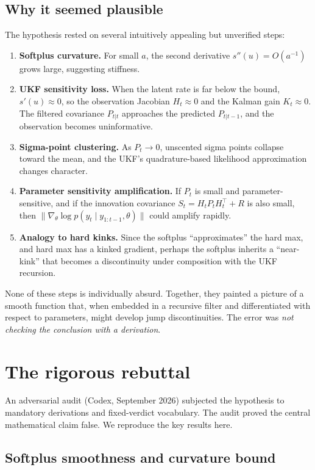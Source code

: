 \subsection{Why it seemed plausible}

The hypothesis rested on several intuitively appealing but unverified steps:
\begin{enumerate}
\item \textbf{Softplus curvature.} For small $a$, the second derivative $s''(u) = O(a^{-1})$ grows large, suggesting stiffness.
\item \textbf{UKF sensitivity loss.} When the latent rate is far below the bound, $s'(u) \approx 0$, so the observation Jacobian $H_t \approx 0$ and the Kalman gain $K_t \approx 0$. The filtered covariance $P_{t|t}$ approaches the predicted $P_{t|t-1}$, and the observation becomes uninformative.
\item \textbf{Sigma-point clustering.} As $P_t \to 0$, unscented sigma points collapse toward the mean, and the UKF's quadrature-based likelihood approximation changes character.
\item \textbf{Parameter sensitivity amplification.} If $P_t$ is small and parameter-sensitive, and if the innovation covariance $S_t = H_t P_t H_t^\top + R$ is also small, then $\|\nabla_\theta \log p(y_t \mid y_{1:t-1}, \theta)\|$ could amplify rapidly.
\item \textbf{Analogy to hard kinks.} Since the softplus ``approximates'' the hard max, and hard max has a kinked gradient, perhaps the softplus inherits a ``near-kink'' that becomes a discontinuity under composition with the UKF recursion.
\end{enumerate}

None of these steps is individually absurd. Together, they painted a picture of a smooth function that, when embedded in a recursive filter and differentiated with respect to parameters, might develop jump discontinuities. The error was \emph{not checking the conclusion with a derivation}.


\section{The rigorous rebuttal}

An adversarial audit (Codex, September 2026) subjected the hypothesis to mandatory derivations and fixed-verdict vocabulary. The audit proved the central mathematical claim false. We reproduce the key results here.

\subsection{Softplus smoothness and curvature bound}

